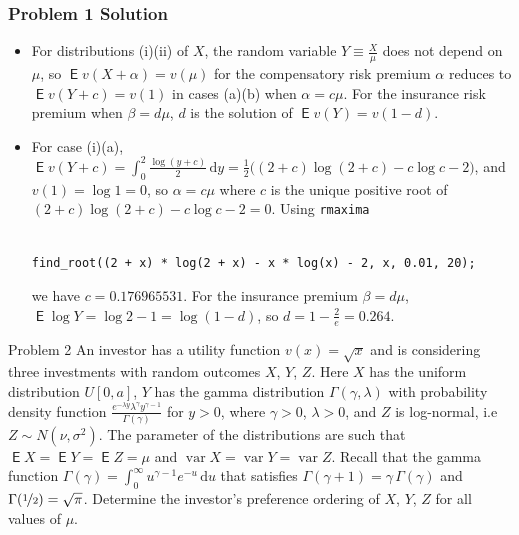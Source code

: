 \documentclass[10pt,handout]{beamer}
\newcommand{\ds}{\displaystyle}
\DeclareMathOperator\expc{\mathsf{E}}
\DeclareMathOperator\var{var}
\theoremstyle{definition}
\begin{document}
\begin{frame}[fragile]
  \frametitle{Problem 1 Solution}
  \begin{itemize}[<+->]
    \item For distributions (i)(ii) of $X$, the random variable $\ds Y\equiv\frac{X}{\mu}$ does not depend on $\mu$, so $\ds\expc v(X + \alpha) = v(\mu)$ for the compensatory risk premium $\alpha$ reduces to $\ds\expc v(Y + c) = v(1)$ in cases (a)(b) when $\alpha=c\mu$. For the insurance risk premium when $\beta = d\mu$, $d$ is the solution of $\expc v(Y) = v(1 - d)$.
    \item For case (i)(a), $\ds\expc v(Y + c) = \int_0^2\frac{\log(y + c)}{2}\,\text{d}y = \frac{1}{2}\big((2 + c)\log(2 + c) - c\log c - 2\big)$, and $v(1) = \log 1 = 0$, so $\alpha = c\mu$ where $c$ is the unique positive root of $(2 + c)\log(2 + c) - c\log c - 2 = 0$. Using {\tt rmaxima}
\begin{verbatim}

find_root((2 + x) * log(2 + x) - x * log(x) - 2, x, 0.01, 20);

\end{verbatim}
  we have $c = 0.176965531$. For the insurance premium $\beta = d\mu$, $\ds\expc\log Y = \log 2 - 1 = \log(1 - d)$, so $\ds d = 1 - \frac{2}{e} = 0.264$.
  \end{itemize}
\end{frame}

\begin{frame}{Problem 2}
  An investor has a utility function $v(x) = \sqrt{x}$ and is considering three investments with random outcomes $X$, $Y$, $Z$. Here $X$ has the uniform distribution $U[0, a]$, $Y$ has the gamma distribution $\Gamma(\gamma,\lambda)$ with probability density function $\ds\frac{e^{-\lambda y}\lambda^\gamma y^{\gamma - 1}}{\Gamma(\gamma)}$ for $y > 0$, where $\gamma > 0$, $\lambda > 0$, and $Z$ is log-normal, i.e $Z\sim N(\nu, \sigma^2)$. The parameter of the distributions are such that $\expc X = \expc Y = \expc Z = \mu$ and $\var X = \var Y = \var Z$. Recall that the gamma function $\ds\Gamma(\gamma) = \int_0^\infty u^{\gamma - 1} e^{-u}\,\text{d}u$ that satisfies $\Gamma(\gamma + 1) = \gamma\,\Gamma(\gamma)$ and $\Gamma(\nicefrac{1}{2}) = \sqrt{\pi}$. Determine the investor's preference ordering of $X$, $Y$, $Z$ for all values of $\mu$.
\end{frame}
\end{document}
